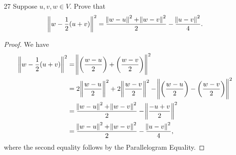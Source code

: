 \documentclass{extarticle}
\newenvironment{problem}[1]{\begin{prob*}{#1}{}}{\end{prob*}}
\begin{document}
\begin{problem}{27}
Suppose $u,v,w\in V$.  Prove that
\begin{equation*}
\norm{w - \frac{1}{2}(u + v)}^2 = \frac{\norm{w - u}^2 + \norm{w - v}^2}{2} - \frac{\norm{u - v}^2}{4}.
\end{equation*}
\end{problem}
\begin{proof}
We have
\begin{align*}
\norm{w - \frac{1}{2}(u + v)}^2 &= \norm{\left(\frac{w - u}{2}\right) + \left(\frac{w - v}{2} \right)}^2\\
&=  2\norm{\frac{w - u}{2}}^2 + 2 \norm{\frac{w - v}{2}}^2 - \norm{\left(\frac{w-u}{2}\right) - \left(\frac{w-v}{2}\right)}^2\\
&= \frac{\norm{w-u}^2 + \norm{w - v}^2}{2} - \norm{\frac{-u + v}{2}}^2\\
&= \frac{\norm{w-u}^2 + \norm{w - v}^2}{2} - \frac{\norm{u - v}^2}{4},
\end{align*}
where the second equality follows by the Parallelogram Equality.
\end{proof}
\end{document}
